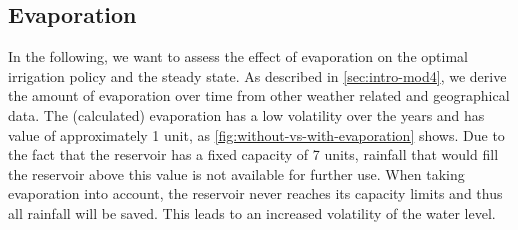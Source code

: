\documentclass[12pt, a4paper, oneside]{article}
\begin{document}
\subsection{Evaporation}
In the following, we want to assess the effect of evaporation on the optimal irrigation policy and the steady state. 
As described in \ref{sec:intro-mod4}, we derive the amount of evaporation over time from other weather related and geographical data. 
The (calculated) evaporation has a low volatility over the years and has value of approximately 1 unit, as \ref{fig:without-vs-with-evaporation} shows. 
Due to the fact that the reservoir has a fixed capacity of 7 units, rainfall that would fill the reservoir above this value is not available for further use. 
When taking evaporation into account, the reservoir never reaches its capacity limits and thus all rainfall will be saved. This leads to an increased volatility of the water level. 
\\
\end{document}
